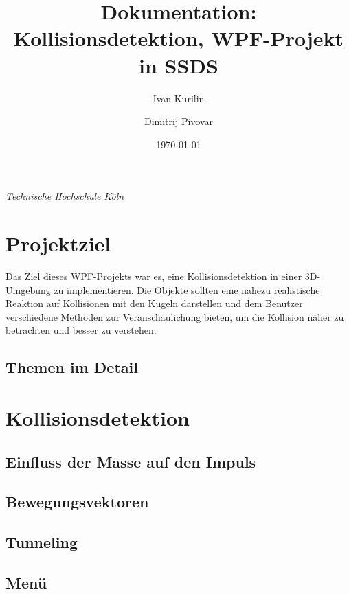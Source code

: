\documentclass[11pt,a4paper]{article}
\title{Dokumentation: Kollisionsdetektion, WPF-Projekt in SSDS}
\author{Ivan Kurilin \and Dimitrij Pivovar}
\date{\today}
\begin{document}
	\maketitle
	\begin{center}
		\textit{Technische Hochschule Köln}
	\end{center}
	\section*{Projektziel}	
	
	Das Ziel dieses WPF-Projekts war es, eine Kollisionsdetektion in einer 3D-Umgebung zu implementieren. Die Objekte sollten eine nahezu realistische Reaktion auf Kollisionen mit den Kugeln darstellen und dem Benutzer verschiedene Methoden zur Veranschaulichung bieten, um die Kollision näher zu betrachten und besser zu verstehen.
	
	\subsection*{Themen im Detail}
	
	\section{Kollisionsdetektion}
	\subsection{Einfluss der Masse auf den Impuls}
	\subsection{Bewegungsvektoren}
	\subsection{Tunneling}
	\subsection{Menü}
	
	
	
	
	
\end{document}
